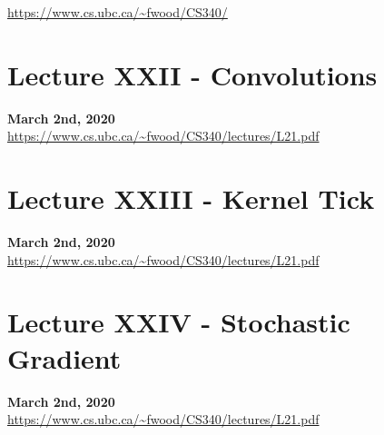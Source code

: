 \documentclass{article}
\theoremstyle{definition}
\begin{document}
\noindent \url{https://www.cs.ubc.ca/~fwood/CS340/}

\section*{Lecture XXII - Convolutions}
\textbf{March 2nd, 2020} \\
\url{https://www.cs.ubc.ca/~fwood/CS340/lectures/L21.pdf}

\newpage

\section*{Lecture XXIII - Kernel Tick}
\textbf{March 2nd, 2020} \\
\url{https://www.cs.ubc.ca/~fwood/CS340/lectures/L21.pdf}

\newpage

\section*{Lecture XXIV - Stochastic Gradient}
\textbf{March 2nd, 2020} \\
\url{https://www.cs.ubc.ca/~fwood/CS340/lectures/L21.pdf}
\end{document}
